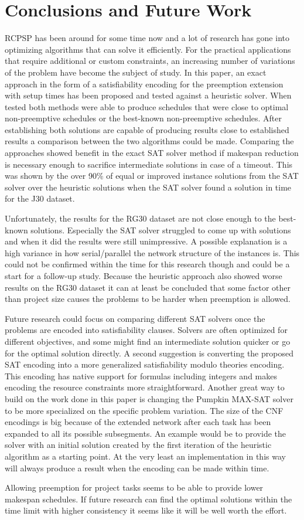 \section{Conclusions and Future Work}
RCPSP has been around for some time now and a lot of research has gone into optimizing algorithms that can solve it efficiently. For the practical applications that require additional or custom constraints, an increasing number of variations of the problem have become the subject of study. In this paper, an exact approach in the form of a satisfiability encoding for the preemption extension with setup times has been proposed and tested against a heuristic solver. When tested both methods were able to produce schedules that were close to optimal non-preemptive schedules or the best-known non-preemptive schedules. After establishing both solutions are capable of producing results close to established results a comparison between the two algorithms could be made. Comparing the approaches showed benefit in the exact SAT solver method if makespan reduction is necessary enough to sacrifice intermediate solutions in case of a timeout. This was shown by the over 90\% of equal or improved instance solutions from the SAT solver over the heuristic solutions when the SAT solver found a solution in time for the J30 dataset.

Unfortunately, the results for the RG30 dataset are not close enough to the best-known solutions. Especially the SAT solver struggled to come up with solutions and when it did the results were still unimpressive. A possible explanation is a high variance in how serial/parallel the network structure of the instances is. This could not be confirmed within the time for this research though and could be a start for a follow-up study. Because the heuristic approach also showed worse results on the RG30 dataset it can at least be concluded that some factor other than project size causes the problems to be harder when preemption is allowed.

Future research could focus on comparing different SAT solvers once the problems are encoded into satisfiability clauses. Solvers are often optimized for different objectives, and some might find an intermediate solution quicker or go for the optimal solution directly. A second suggestion is converting the proposed SAT encoding into a more generalized satisfiability modulo theories encoding. This encoding has native support for formulas including integers and makes encoding the resource constraints more straightforward. Another great way to build on the work done in this paper is changing the Pumpkin MAX-SAT solver to be more specialized on the specific problem variation. The size of the CNF encodings is big because of the extended network after each task has been expanded to all its possible subsegments. An example would be to provide the solver with an initial solution created by the first iteration of the heuristic algorithm as a starting point. At the very least an implementation in this way will always produce a result when the encoding can be made within time.

Allowing preemption for project tasks seems to be able to provide lower makespan schedules. If future research can find the optimal solutions within the time limit with higher consistency it seems like it will be well worth the effort.